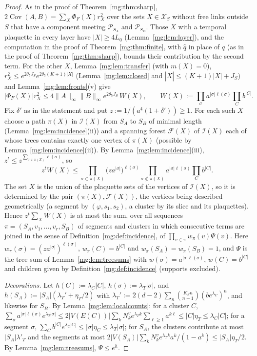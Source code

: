 \documentclass[11pt,a4paper]{article}
\theoremstyle{definition}
\theoremstyle{remark}
\DeclareMathOperator{\Cov}{Cov}
\newcommand{\cP}{\mathcal{P}}
\newcommand{\cX}{\mathcal{X}}
\newcommand{\norm}[1]{\lVert #1\rVert}
\begin{document}
\begin{proof}
As in the proof of Theorem~\ref{mg:thm:sharp}, $2\Cov(A,B)=\sum_X\Phi_F(X)r_X^2$ over the sets $X\in\cX_S$ without free links outside $S$ that have a
component meeting $\cP_{S_A}$ and $\cP_{S_B}$. Those $X$ with a temporal plaquette in every layer have $|X|\ge4L_0$ (Lemma~\ref{mg:lem:layer}), and the
computation in the proof of Theorem~\ref{mg:thm:finite}, with $\hat q$ in place of $q$ (as in the proof of Theorem~\ref{mg:thm:sharp}), bounds their
contribution by the second term. For the other $X$, Lemma~\ref{mg:lem:transfer} (with $m(X)=0$), $r_X^2\le e^{2\theta_5J_S}e^{2\theta_5(K+1)|X|}$
(Lemma~\ref{mg:lem:closed} and $|\overline X|\le(K+1)|X|+J_S$) and Lemma~\ref{mg:lem:fronts}(v) give
\[
|\Phi_F(X)|r_X^2\le4\norm A_\infty\norm B_\infty e^{2\theta_5J_S}\,W(X),\qquad W(X):=\prod_\sigma a^{|\sigma|\ell(\sigma)}\prod_Cb^{|C|}.
\]
Fix $\delta'$ as in the statement and put $z:=1/(a^4(1+\delta'))\ge1$. For each such $X$ choose a path $\pi(X)$ in $\mathcal I(X)$ from $S_A$ to $S_B$ of
minimal length (Lemma~\ref{mg:lem:incidence}(ii)) and a spanning forest $\mathcal F(X)$ of $\mathcal I(X)$ each of whose trees contains exactly one vertex of
$\pi(X)$ (possible by Lemma~\ref{mg:lem:incidence}(ii)). By Lemma~\ref{mg:lem:incidence}(iii), $z^t\le z^{\sum_{\sigma\in\pi(X)}\ell(\sigma)}$, so
\[
z^tW(X)\le\prod_{\sigma\in\pi(X)}\bigl(za^{|\sigma|}\bigr)^{\ell(\sigma)}\prod_{\sigma\notin\pi(X)}a^{|\sigma|\ell(\sigma)}\prod_Cb^{|C|} .
\]
The set $X$ is the union of the plaquette sets of the vertices of $\mathcal I(X)$, so it is determined by the pair $(\pi(X),\mathcal F(X))$, the vertices being described
geometrically (a segment by $(\varphi,s_1,s_2)$, a cluster by its slice and its plaquettes). Hence $z^t\sum_XW(X)$ is at most the sum, over all sequences
$\pi=(S_A,v_1,\dots,v_r,S_B)$ of segments and clusters in which consecutive terms are joined in the sense of Definition~\ref{mg:def:incidence}, of
$\prod_{v\in\pi}w_\pi(v)\Psi(v)$. Here $w_\pi(\sigma)=(za^{|\sigma|})^{\ell(\sigma)}$, $w_\pi(C)=b^{|C|}$ and $w_\pi(S_A)=w_\pi(S_B)=1$, and $\Psi$ is the tree sum of
Lemma~\ref{mg:lem:treesums} with $w(\sigma)=a^{|\sigma|\ell(\sigma)}$, $w(C)=b^{|C|}$ and children given by Definition~\ref{mg:def:incidence} (supports
excluded).

\emph{Decorations.} Let $h(C):=\lambda_C|C|$, $h(\sigma):=\lambda_T|\sigma|$, and $h(S_A):=|S_A|(\lambda_T'+\eta_T/2)$ with
$\lambda_T':=2(d-2)\sum_n\binom{K_Sn}{n-1}(be^{\lambda_C})^n$, and likewise for $S_B$. By Lemma~\ref{mg:lem:localcounts}: for a cluster $C$,
$\sum_\sigma a^{|\sigma|\ell(\sigma)}e^{\lambda_T|\sigma|}\le2|V(E(C))|\sum_kN^v_ke^{\lambda_Tk}\sum_{\ell\ge1}a^{k\ell}\le|C|\eta_T\le\lambda_C|C|$; for a segment $\sigma$,
$\sum_Cb^{|C|}e^{\lambda_C|C|}\le|\sigma|\eta_C\le\lambda_T|\sigma|$; for $S_A$, the clusters contribute at most $|S_A|\lambda'_T$ and the segments at most
$2|V(S_A)|\sum_kN^v_ke^{\lambda_Tk}a^k/(1-a^k)\le|S_A|\eta_T/2$. By Lemma~\ref{mg:lem:treesums}, $\Psi\le e^h$.


\end{proof}
\end{document}
